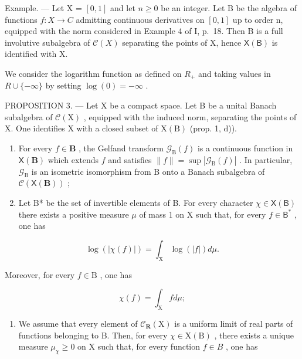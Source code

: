 Example. --- Let X = \([0,1]\) and let \(n \geqslant 0\) be an integer. Let B be the algebra of functions \(f: X \to C\) admitting continuous derivatives on \([0,1]\) up to order n, equipped with the norm considered in Example 4 of I, p.~18. Then B is a full involutive subalgebra of \(\mathcal{C}(X)\) separating the points of X, hence \(\mathsf{X}(\mathsf{B})\) is identified with X.

We consider the logarithm function as defined on \(R_{+}\) and taking values in \(R \cup \{-\infty\}\) by setting \(\log(0) = -\infty\) .

PROPOSITION 3. --- Let X be a compact space. Let B be a unital Banach subalgebra of \(\mathcal{C}(\mathrm{X})\) , equipped with the induced norm, separating the points of X. One identifies X with a closed subset of \(\mathrm{X(B)}\) (prop. 1, d)).

\begin{enumerate}
\def\labelenumi{\alph{enumi})}
\item
  For every \(f \in \mathbf{B}\) , the Gelfand transform \(\mathcal{G}_{\mathrm{B}}(f)\) is a continuous function in \(\mathsf{X}(\mathbf{B})\) which extends \(f\) and satisfies \(\| f \| = \sup |\mathcal{G}_{\mathrm{B}}(f)|\) . In particular, \(\mathcal{G}_{\mathrm{B}}\) is an isometric isomorphism from B onto a Banach subalgebra of \(\mathcal{C}(\mathsf{X}(\mathbf{B}))\) ;
\item
  Let B* be the set of invertible elements of B. For every character \(\chi \in \mathsf{X}(\mathsf{B})\) there exists a positive measure \(\mu\) of mass 1 on X such that, for every \(f \in \mathsf{B}^*\) , one has
\end{enumerate}

\[
\log (| \chi (f) |) = \int_ {\mathrm{X}} \log (| f |) d \mu .
\]

Moreover, for every \(f \in \mathrm{B}\) , one has

\[
\chi (f) = \int_ {\mathrm{X}} f d \mu ;
\]

\begin{enumerate}
\def\labelenumi{\alph{enumi})}
\setcounter{enumi}{2}
\tightlist
\item
  We assume that every element of \(\mathcal{C}_{\mathbf{R}}(\mathrm{X})\) is a uniform limit of real parts of functions belonging to B. Then, for every \(\chi \in \mathrm{X}(\mathrm{B})\) , there exists a unique measure \(\mu_{\chi} \geqslant 0\) on X such that, for every function \(f \in B\) , one has
\end{enumerate}

